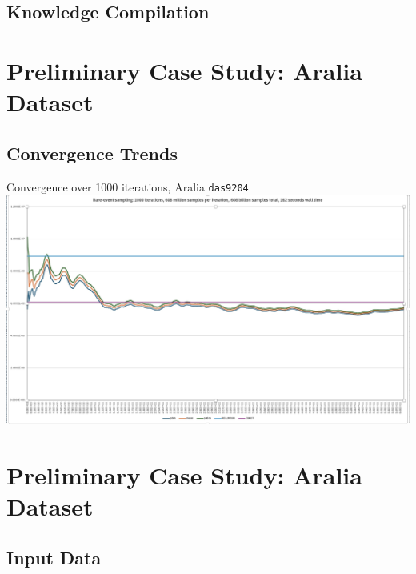 

\subsection{Knowledge Compilation}


\section{Preliminary Case Study: Aralia Dataset}
\subsection{Convergence Trends}
\begin{frame}{Convergence over 1000 iterations, Aralia \texttt{das9204}}
    \centering
    \includegraphics[height=0.9\textheight]{4_casestudy/rare-event.jpg}
\end{frame}


\section{Preliminary Case Study: Aralia Dataset}
\subsection{Input Data}
\begin{frame}[allowframebreaks]
    \centering
     \tiny{}
\end{frame}